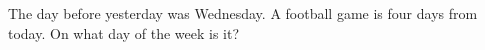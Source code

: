 The day before yesterday was Wednesday. A football game is four days from today. On what day of the week is it?
